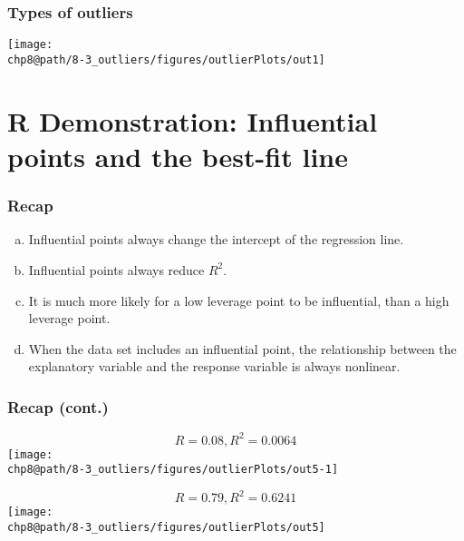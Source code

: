 \documentclass[slidestop,compress,mathserif]{beamer}
\makeatletter
\newcommand{\soln}[1]{\textit{#1}}
\def\chp8@path{../../Chp 8}
\makeatother
\begin{document}

\begin{frame}
\frametitle{Types of outliers}

{
\soln{}

}
{
\begin{center}
\texttt{[image: \\chp8@path/8-3\_outliers/figures/outlierPlots/out1]}
\end{center}
}

\end{frame}


\section{R Demonstration: Influential points and the best-fit line}


\begin{frame}
\frametitle{Recap}


\begin{enumerate}[(a)]
\item Influential points always change the intercept of the regression line.
\item Influential points always reduce $R^2$.
\item It is much more likely for a low leverage point to be influential, than a high leverage point.
\item When the data set includes an influential point, the relationship between the explanatory variable and the response variable is always nonlinear.
\end{enumerate}

\end{frame}


\begin{frame}
\frametitle{Recap (cont.)}

\vspace{-1cm}

{
\begin{center}
\[ R = 0.08, R^2 = 0.0064 \]
\texttt{[image: \\chp8@path/8-3\_outliers/figures/outlierPlots/out5-1]}
\end{center}
}
{
\begin{center}
\[ R = 0.79, R^2 = 0.6241 \]
\texttt{[image: \\chp8@path/8-3\_outliers/figures/outlierPlots/out5]}
\end{center}
}

\end{frame}

\end{document}
